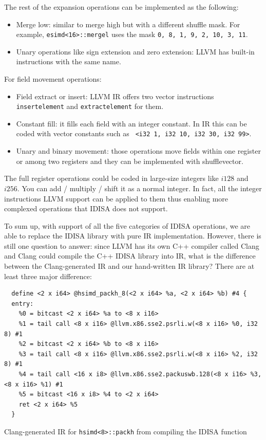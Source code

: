 The rest of the expansion operations can be implemented as the following:
\begin{itemize}
    \item Merge low: similar to merge high but with a different shuffle mask. For example, {\tt esimd<16>::mergel} uses the mask {\tt 0, 8, 1, 9, 2, 10, 3, 11}.
    \item Unary operations like sign extension and zero extension: LLVM has built-in instructions with the same name.
\end{itemize}

For field movement operations:
\begin{itemize}
    \item Field extract or insert: LLVM IR offers two vector instructions {\tt insertelement} and {\tt extractelement} for them.
    \item Constant fill: it fills each field with an integer constant. In IR this can be coded with vector constants such as {\tt <4 x i32> <i32 1, i32 10, i32 30, i32 99>}.
    \item Unary and binary movement: those operations move fields within one register or among two registers and they can be implemented with shufflevector.
\end{itemize}

The full register operations could be coded in large-size integers like $i128$ and $i256$. You can add / multiply / shift it as a normal integer. In fact, all the integer instructions LLVM support can be applied to them thus enabling more complexed operations that IDISA does not support.

To sum up, with support of all the five categories of IDISA operations, we are able to replace the IDISA library with pure IR implementation. However, there is still one question to answer: since LLVM has its own C++ compiler called Clang and Clang could compile the C++ IDISA library into IR, what is the difference between the Clang-generated IR and our hand-written IR library? There are at least three major difference:

\begin{program}
\begin{verbatim}
  define <2 x i64> @hsimd_packh_8(<2 x i64> %a, <2 x i64> %b) #4 {
  entry:
    %0 = bitcast <2 x i64> %a to <8 x i16>
    %1 = tail call <8 x i16> @llvm.x86.sse2.psrli.w(<8 x i16> %0, i32 8) #1
    %2 = bitcast <2 x i64> %b to <8 x i16>
    %3 = tail call <8 x i16> @llvm.x86.sse2.psrli.w(<8 x i16> %2, i32 8) #1
    %4 = tail call <16 x i8> @llvm.x86.sse2.packuswb.128(<8 x i16> %3, <8 x i16> %1) #1
    %5 = bitcast <16 x i8> %4 to <2 x i64>
    ret <2 x i64> %5
  }
\end{verbatim}
\caption{Clang-generated IR for {\tt hsimd<8>::packh} from compiling the IDISA function}
\label{prog:packh_8_sse2_llvm}
\end{program}

